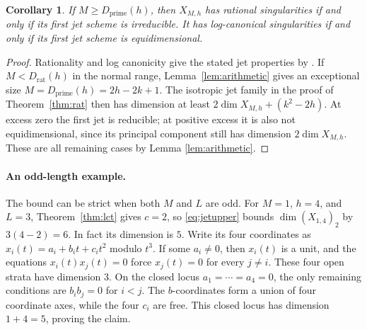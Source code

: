 \documentclass[11pt]{article}
\numberwithin{equation}{section}
\newtheorem{corollary}[theorem]{Corollary}
\theoremstyle{remark}
\newcommand{\Dprime}{D_{\mathrm{prime}}}
\newcommand{\Drat}{D_{\mathrm{rat}}}
\begin{document}
\begin{corollary}
If $M\ge\Dprime(h)$, then $X_{M,h}$ has rational
singularities if and only if its first jet scheme is
irreducible. It has log-canonical singularities if and
only if its first jet scheme is equidimensional.
\end{corollary}
\begin{proof}
Rationality and log canonicity give the stated jet properties
by \cite{Mjets,EM}. If $M<\Drat(h)$ in the normal range,
Lemma~\ref{lem:arithmetic} gives an exceptional size
$M=\Dprime(h)=2h-2k+1$. The isotropic jet family in the
proof of Theorem~\ref{thm:rat} then has dimension at least
$2\dim X_{M,h}+(k^2-2h)$. At excess zero the first jet is reducible; at
positive excess it is also not equidimensional, since its
principal component still has dimension $2\dim X_{M,h}$.
These are all remaining cases by Lemma \ref{lem:arithmetic}.
\end{proof}

\paragraph{An odd-length example.}
The bound can be strict when both $M$ and $L$ are odd. For
$M=1$, $h=4$, and $L=3$, Theorem~\ref{thm:lct} gives $c=2$,
so \eqref{eq:jetupper} bounds $\dim(X_{1,4})_2$ by $3(4-2)=6$.
In fact its dimension is $5$. Write its four coordinates as
$x_i(t)=a_i+b_it+c_it^2$ modulo $t^3$.
If some $a_i\ne0$, then $x_i(t)$ is a unit, and the equations
$x_i(t)x_j(t)=0$ force $x_j(t)=0$ for every $j\ne i$.
These four open strata have dimension $3$.
On the closed locus $a_1=\cdots=a_4=0$, the only remaining
conditions are $b_ib_j=0$ for $i<j$. The $b$-coordinates form
a union of four coordinate axes, while the four $c_i$ are free.
This closed locus has dimension $1+4=5$, proving the claim.
\end{document}
